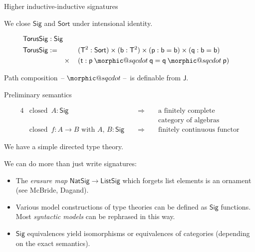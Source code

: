 \documentclass[dvipsnames]{beamer}
\makeatletter
\DeclareRobustCommand{\sqcdot}{\mathbin{\mathpalette\morphic@sqcdot\relax}}
\newcommand{\morphic@sqcdot}[2]{%
  \sbox\z@{$\m@th#1\centerdot$}%
  \ht\z@=.33333\ht\z@
  \vcenter{\box\z@}%
}
\newcommand{\ms}[1]{\mathsf{#1}}
\newcommand{\blank}{\mathord{\hspace{1pt}\text{--}\hspace{1pt}}}
\newcommand{\Sort}{\mathsf{Sort}}
\newcommand{\Sig}{\mathsf{Sig}}
\newcommand{\p}{\mathsf{p}}
\newcommand{\q}{\mathsf{q}}
\makeatother
\begin{document}
\begin{frame}{Higher inductive-inductive signatures}

We close $\Sig$ and $\Sort$ under \alert{intensional} identity.
\vspace{1em}

\begin{exampleblock}{}
  \vspace{-1.3em}
  \begin{alignat*}{3}
    &\rlap{$\ms{TorusSig} : \Sig$} \\
    & \ms{TorusSig} := && &&\,(\ms{T}^2 : \Sort) \times (\ms{b} : \ms{T}^2) \times (\p : \ms{b} = \ms{b}) \times (\q : \ms{b} = \ms{b}) \\
    &  && \times &&\,(\ms{t} : \p \sqcdot \q = \q \sqcdot \p)
  \end{alignat*}
\end{exampleblock}
\vspace{1em}
Path composition $\blank\sqcdot\blank$ is definable from $\ms{J}$.

\end{frame}


\begin{frame}{Preliminary semantics}

\begin{block}{}
  \vspace{-1.3em}
  \begin{alignat*}{4}
    & \text{closed  }\,A : \Sig &&\,\,\Longrightarrow&& \text{ a finitely complete } \\
    &  && &&\text{ category of algebras}\\
    & \text{closed  }\,f : A \to B \text{ with } A,\,B : \Sig &&\,\,\Longrightarrow&& \text{ finitely continuous functor}
  \end{alignat*}
\end{block}
\vspace{1em}
We have a simple directed type theory.
\vspace{1em}

We can do more than just write signatures:
\begin{itemize}
\item The \emph{erasure map} $\ms{NatSig} \to \ms{ListSig}$ which forgets list elements
      is an \alert{ornament} (see McBride, Dagand).
\item Various \alert{model constructions} of type theories can be defined as $\Sig$
      functions. Most \emph{syntactic models} can be rephrased in this way.
\item $\Sig$ equivalences yield isomorphisms or equivalences of categories (depending
      on the exact semantics).
\end{itemize}
\end{frame}
\end{document}
